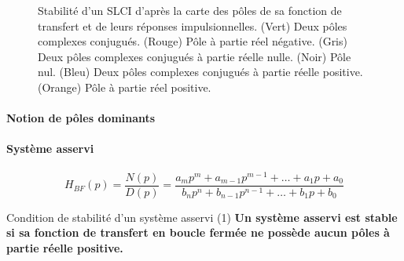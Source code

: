\clearpage
\thispagestyle{empty}
\begin{landscape}
\centering
\captionsetup{width=1.15\linewidth}
\begin{figure}[!h]
    \centering
    
    \caption{Stabilité d'un SLCI d'après la carte des pôles de sa fonction de
             transfert et de leurs réponses impulsionnelles. 
             (Vert) Deux pôles complexes conjugués. 
             (Rouge) Pôle à partie réel négative. 
             (Gris) Deux pôles complexes conjugués à partie réelle nulle.
             (Noir) Pôle nul.
             (Bleu) Deux pôles complexes conjugués à partie réelle positive.
             (Orange) Pôle à partie réel positive.}
    \end{figure}
\end{landscape}
\clearpage
\pagestyle{fancy}
\captionsetup{width=0.8\linewidth}


\paragraph{Notion de pôles dominants}

\paragraph{Système asservi}

\begin{center}
    
\end{center}

$$
H_{BF}(p)=\dfrac{N(p)}{D(p)}=\dfrac{a_mp^m+a_{m-1}p^{m-1}+\ldots+a_1p+a_0}
                                   {b_np^n+b_{n-1}p^{n-1}+\ldots+b_1p+b_0}
$$

\begin{criteria}{Condition de stabilité d'un système asservi (1)}
    \textbf{Un système asservi est stable si sa fonction de transfert en 
            boucle fermée ne possède aucun pôles à partie réelle positive.}
\end{criteria}



